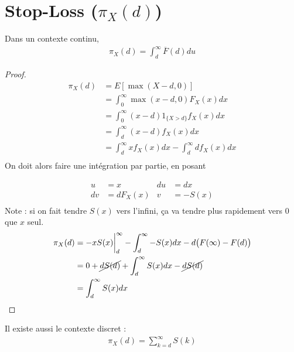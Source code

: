 
\section{Stop-Loss ($\pi_X(d)$)}
\label{preuve:stoploss}
Dans un contexte continu,
\begin{align*}
\pi_X(d) = \int_d^\infty \overline{F}(d) du
\end{align*}

\begin{proof}
\begin{align*}
\pi_X(d)		& = E[\max(X-d,0)] \\
	& = \int_0^\infty \max(x - d, 0) F_X(x) dx \\
	& = \int_0^\infty (x-d) 1_{\{X > d \}} f_X(x) dx \\
	& = \int_d^\infty (x-d) f_X(x) dx \\
	& = \int_d^\infty x f_X(x) dx - \int_d^\infty d f_X(x) dx \\
\end{align*}
On doit alors faire une intégration par partie, en posant

\begin{displaymath}
\begin{aligned}
u	& = x		& du	 & = dx \\
dv	& = dF_X(x)	& v	 & = -S(x) \\	
\end{aligned}
\end{displaymath}
Note : si on fait tendre $S(x)$ vers l'infini, ça va tendre plus rapidement vers 0 que $x$ seul.
\begin{align*}
\pi_X(d)	& = -xS(x) \biggr \rvert_d^\infty - \int_d^\infty - S(x) dx - d \big(F(\infty) - F(d) \big) \\
	& = 0 + \cancel{dS(d)} + \int_d^\infty S(x) dx - \cancel{dS(d)} \\
	& = \int_d^\infty S(x) dx \\
\end{align*}
\end{proof}
Il existe aussi le contexte discret : 
\begin{align*}
\pi_X(d) = \sum_{k=d}^\infty S(k)
\end{align*}
